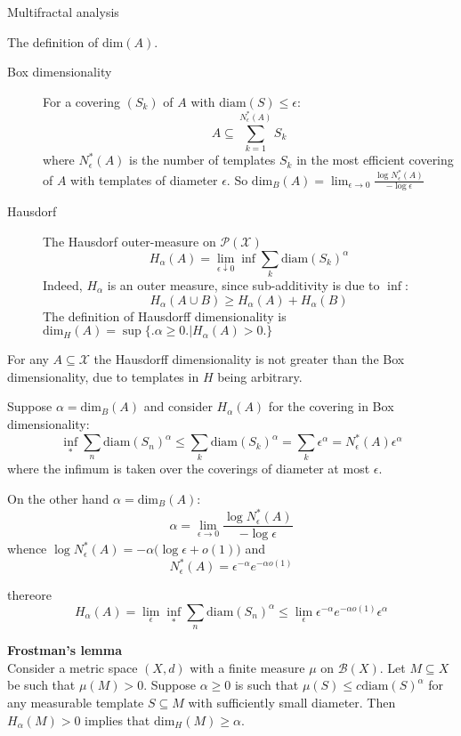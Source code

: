 \documentclass[a4paper]{article}
\newcommand{\Xcal}{\mathcal{X}}
\begin{document}
Multifractal analysis

The definition of $\text{dim}(A)$.
\begin{description}
	\item[Box dimensionality] For a covering $(S_k)$ of $A$ with $\text{diam}(S)\leq \epsilon$:
	\[A \subseteq \sum_{k=1}^{N^*_\epsilon(A)} S_k \]
	where $N^*_\epsilon(A)$ is the number of templates $S_k$ in the most efficient covering of $A$ with templates of diameter $\epsilon$.
	So $\text{dim}_B(A) = \lim_{\epsilon \to 0} \frac{\log N^*_\epsilon(A)}{-\log \epsilon}$
	\item[Hausdorf] The Hausdorf outer-measure on $\mathcal{P}(\Xcal)$
	\[H_\alpha(A) = \lim_{\epsilon\downarrow 0} \inf \sum_k \text{diam}(S_k)^\alpha\]
	Indeed, $H_\alpha$ is an outer measure, since sub-additivity is due to $\inf$: \[H_\alpha(A\cup B) \geq H_\alpha(A)+H_\alpha(B)\]
	The definition of Hausdorff dimensionality is
	$\text{dim}_H(A) = \sup\big\{\big. \alpha\geq 0\big.\big\rvert H_\alpha(A) > 0 \big.\big\}$
\end{description}

For any $A\subseteq \Xcal$ the Hausdorff dimensionality is not greater than the Box dimensionality, due to templates in $H$ being arbitrary.

Suppose $\alpha = \text{dim}_B(A)$ and consider $H_\alpha(A)$ for the covering in Box dimensionality:
\[\inf_{*} \sum_n \text{diam}(S_n)^\alpha \leq \sum_k \text{diam}(S_k)^\alpha = \sum_k \epsilon^\alpha = N^*_\epsilon(A) \epsilon^\alpha\]
where the infimum is taken over the coverings of diameter at most $\epsilon$.

On the other hand $\alpha = \text{dim}_B(A)$:
\[\alpha = \lim_{\epsilon\to 0}\frac{\log N^*_\epsilon(A)}{-\log \epsilon}\]
whence $\log N^*_\epsilon(A) = -\alpha \big(\log \epsilon + o(1)\big)$
and
\[N^*_\epsilon(A) = \epsilon^{-\alpha}e^{-\alpha o(1)}\]

thereore
\[H_\alpha(A) = \lim_{\epsilon} \inf_{*} \sum_n \text{diam}(S_n)^\alpha \leq \lim_{\epsilon} \epsilon^{-\alpha}e^{-\alpha o(1)} \epsilon^\alpha \]


\noindent\textbf{Frostman's lemma}\hfill\\
Consider a metric space $(X,d)$ with a finite measure $\mu$ on $\mathcal{B}(X)$. Let $M\subseteq X$ be such that $\mu(M) > 0$. Suppose $\alpha\geq 0$ is such that $\mu(S) \leq c \text{diam}(S)^\alpha$ for any measurable template $S\subseteq M$ with sufficiently small diameter. Then $H_\alpha(M)>0$ implies that $\text{dim}_H(M) \geq \alpha$.
\end{document}
